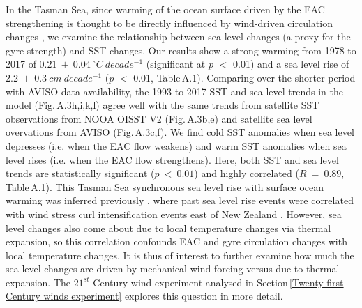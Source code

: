 \documentclass[draft,linenumbers]{agujournal2018}
\begin{document}
In the Tasman Sea, since warming of the ocean surface driven by the EAC strengthening is thought to be directly influenced by wind-driven circulation changes \citep{Hill2011,Oliver2014,Ridgway2007b,Roemmich2007,Wu2012}, we examine the relationship between sea level changes (a proxy for the gyre strength) and SST changes. Our results show a strong warming from 1978 to 2017 of $0.21\ \pm\ 0.04\ ^{\circ}C\ decade^{-1}$ (significant at $p$ $<$ 0.01) and a sea level rise of $2.2\ \pm\ 0.3\ cm\ decade^{-1}$ ($p$ $<$ 0.01, Table\,A.1). Comparing over the shorter period with AVISO data availability, the 1993 to 2017 SST and sea level trends in the model (Fig.\,A.3h,i,k,l) agree well with the same trends from satellite SST observations from NOOA OISST V2 (Fig.\,A.3b,e) and satellite sea level overvations from AVISO (Fig.\,A.3c,f). We find cold SST anomalies when sea level depresses (i.e. when the EAC flow weakens) and warm SST anomalies when sea level rises (i.e. when the EAC flow strengthens). Here, both SST and sea level trends are statistically significant ($p\ <\ 0.01$) and highly correlated ($R\ =\ 0.89$, Table\,A.1). This Tasman Sea synchronous sea level rise with surface ocean warming was inferred previously \citep{Holbrook1997}, where past sea level rise events were correlated with wind stress curl intensification events east of New Zealand \citep{Roemmich2007}. However, sea level changes also come about due to local temperature changes via thermal expansion, so this correlation confounds EAC and gyre circulation changes with local temperature changes. It is thus of interest to further examine how much the sea level changes are driven by mechanical wind forcing versus due to thermal expansion. The $21^{st}$ Century wind experiment analysed in Section\,\ref{Twenty-first Century winds experiment} explores this question in more detail.
\end{document}
